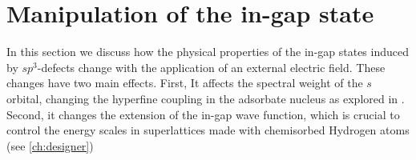 %   
%   
%   



\section{Manipulation of the in-gap state}
In this section we discuss how the physical properties of the in-gap states induced by $sp^3$-defects change with the application of an external electric field.
These changes have two main effects. First, It affects the spectral weight of the $s$ orbital, changing the hyperfine coupling in the adsorbate nucleus as explored in . Second, it changes the extension of the in-gap wave function, which is crucial to control the energy scales in superlattices made with chemisorbed Hydrogen atoms (see \ref{ch:designer})


